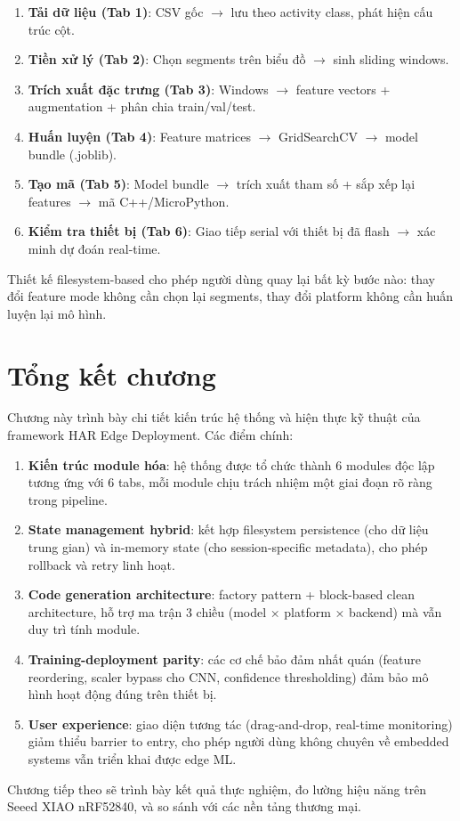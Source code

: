 \begin{enumerate}
    \item \textbf{Tải dữ liệu (Tab 1)}: CSV gốc $\rightarrow$ lưu theo activity class, phát hiện cấu trúc cột.
    \item \textbf{Tiền xử lý (Tab 2)}: Chọn segments trên biểu đồ $\rightarrow$ sinh sliding windows.
    \item \textbf{Trích xuất đặc trưng (Tab 3)}: Windows $\rightarrow$ feature vectors + augmentation + phân chia train/val/test.
    \item \textbf{Huấn luyện (Tab 4)}: Feature matrices $\rightarrow$ GridSearchCV $\rightarrow$ model bundle (.joblib).
    \item \textbf{Tạo mã (Tab 5)}: Model bundle $\rightarrow$ trích xuất tham số + sắp xếp lại features $\rightarrow$ mã C++/MicroPython.
    \item \textbf{Kiểm tra thiết bị (Tab 6)}: Giao tiếp serial với thiết bị đã flash $\rightarrow$ xác minh dự đoán real-time.
\end{enumerate}

Thiết kế filesystem-based cho phép người dùng quay lại bất kỳ bước nào: thay đổi feature mode không cần chọn lại segments, thay đổi platform không cần huấn luyện lại mô hình.

\section{Tổng kết chương}
\label{sec:design_implementation_summary}

Chương này trình bày chi tiết kiến trúc hệ thống và hiện thực kỹ thuật của framework HAR Edge Deployment. Các điểm chính:

\begin{enumerate}
    \item \textbf{Kiến trúc module hóa}: hệ thống được tổ chức thành 6 modules độc lập tương ứng với 6 tabs, mỗi module chịu trách nhiệm một giai đoạn rõ ràng trong pipeline.
    
    \item \textbf{State management hybrid}: kết hợp filesystem persistence (cho dữ liệu trung gian) và in-memory state (cho session-specific metadata), cho phép rollback và retry linh hoạt.
    
    \item \textbf{Code generation architecture}: factory pattern + block-based clean architecture, hỗ trợ ma trận 3 chiều (model × platform × backend) mà vẫn duy trì tính module.
    
    \item \textbf{Training-deployment parity}: các cơ chế bảo đảm nhất quán (feature reordering, scaler bypass cho CNN, confidence thresholding) đảm bảo mô hình hoạt động đúng trên thiết bị.
    
    \item \textbf{User experience}: giao diện tương tác (drag-and-drop, real-time monitoring) giảm thiểu barrier to entry, cho phép người dùng không chuyên về embedded systems vẫn triển khai được edge ML.
\end{enumerate}

Chương tiếp theo sẽ trình bày kết quả thực nghiệm, đo lường hiệu năng trên Seeed XIAO nRF52840, và so sánh với các nền tảng thương mại.
